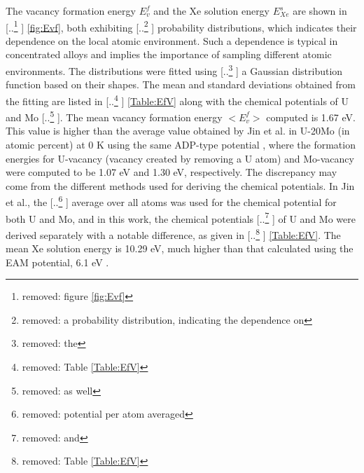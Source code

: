 \documentclass[review]{elsarticle}
\providecommand{\DIFaddtex}[1]{{\protect\color{blue} \sf #1}} %
\providecommand{\DIFdeltex}[1]{{\protect\color{red} [..\footnote{removed: #1} ]}} %
\providecommand{\DIFaddbegin}{} %
\providecommand{\DIFaddend}{} %
\providecommand{\DIFdelbegin}{} %
\providecommand{\DIFdelend}{} %
\providecommand{\DIFadd}[1]{\texorpdfstring{\DIFaddtex{#1}}{#1}} %
\providecommand{\DIFdel}[1]{\texorpdfstring{\DIFdeltex{#1}}{}} %
\newcommand{\DIFscaledelfig}{0.5}
\newlength{\DIFdelgraphicswidth} %
\newlength{\DIFdelgraphicsheight} %
\newcommand{\DIFaddincludegraphics}[2][]{{\color{blue}\fbox{\DIFOincludegraphics[#1]{#2}}}} %
\newcommand{\DIFdelincludegraphics}[2][]{%
\sbox{\DIFdelgraphicsbox}{\DIFOincludegraphics[#1]{#2}}%
\settoboxwidth{\DIFdelgraphicswidth}{\DIFdelgraphicsbox} %
\settoboxtotalheight{\DIFdelgraphicsheight}{\DIFdelgraphicsbox} %
\scalebox{\DIFscaledelfig}{%
\parbox[b]{\DIFdelgraphicswidth}{\usebox{\DIFdelgraphicsbox}\\[-\baselineskip] \rule{\DIFdelgraphicswidth}{0em}}\llap{\resizebox{\DIFdelgraphicswidth}{\DIFdelgraphicsheight}{%
\setlength{\unitlength}{\DIFdelgraphicswidth}%
\begin{picture}(1,1)%
\thicklines\linethickness{2pt} %
{\color[rgb]{1,0,0}\put(0,0){\framebox(1,1){}}}%
{\color[rgb]{1,0,0}\put(0,0){\line( 1,1){1}}}%
{\color[rgb]{1,0,0}\put(0,1){\line(1,-1){1}}}%
\end{picture}%
}\hspace*{3pt}}} %
} %
\DeclareRobustCommand{\DIFaddbegin}{\DIFOaddbegin \let\includegraphics\DIFaddincludegraphics} %
\DeclareRobustCommand{\DIFaddend}{\DIFOaddend \let\includegraphics\DIFOincludegraphics} %
\DeclareRobustCommand{\DIFdelbegin}{\DIFOdelbegin \let\includegraphics\DIFdelincludegraphics} %
\DeclareRobustCommand{\DIFdelend}{\DIFOaddend \let\includegraphics\DIFOincludegraphics} %
\begin{document}
The vacancy formation energy $E^f_v$ and the Xe solution energy $E^s_{Xe}$ are shown in \DIFdelbegin \DIFdel{figure \ref{fig:Evf}}\DIFdelend \DIFaddbegin \DIFadd{\cref{fig:Evf}}\DIFaddend , both exhibiting \DIFdelbegin \DIFdel{a probability distribution, indicating the dependence on }\DIFdelend \DIFaddbegin \DIFadd{probability distributions, which indicates their dependence on the }\DIFaddend local atomic environment. Such a dependence is typical in concentrated alloys and implies the importance of sampling different atomic environments. The distributions were fitted using \DIFdelbegin \DIFdel{the }\DIFdelend \DIFaddbegin \DIFadd{a }\DIFaddend Gaussian distribution function based on their shapes. The mean and standard deviations obtained from the fitting are listed in \DIFdelbegin \DIFdel{Table \ref{Table:EfV} }\DIFdelend \DIFaddbegin \DIFadd{\cref{Table:EfV} }\DIFaddend along with the chemical potentials of U and Mo\DIFdelbegin \DIFdel{as well}\DIFdelend . The mean vacancy formation energy $<E^f_v>$ computed is 1.67 eV. This value is higher than the average value obtained by Jin et al. in U-20Mo (in atomic percent) at 0 K using the same ADP-type potential \cite{jin2021}, where the formation energies for U-vacancy (vacancy created by removing a U atom) and Mo-vacancy were computed to be 1.07 eV and 1.30 eV, respectively. The discrepancy may come from the different methods used for deriving the chemical potentials. In Jin et al., the \DIFdelbegin \DIFdel{potential per atom averaged }\DIFdelend \DIFaddbegin \DIFadd{average }\DIFaddend over all atoms was used for the chemical potential for both U and Mo, and in this work, the chemical potentials \DIFdelbegin \DIFdel{and }\DIFdelend \DIFaddbegin \DIFadd{of }\DIFaddend U and Mo were derived separately with a notable difference, as given in \DIFdelbegin \DIFdel{Table \ref{Table:EfV}}\DIFdelend \DIFaddbegin \DIFadd{\cref{Table:EfV}}\DIFaddend . The mean Xe solution energy is 10.29 eV, much higher than that calculated using the EAM potential, 6.1 eV \cite{Beeler2020}. 
\end{document}
